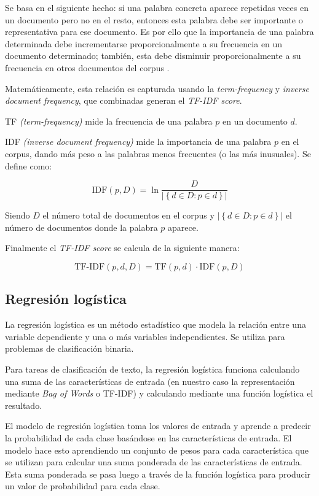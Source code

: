 Se basa en el siguiente hecho: si una palabra concreta aparece repetidas veces en un documento pero no en el resto, entonces esta palabra debe ser importante o representativa para ese documento. Es por ello que la importancia de una palabra determinada debe incrementarse proporcionalmente a su frecuencia en un documento determinado; también, esta debe disminuir proporcionalmente a su frecuencia en otros documentos del corpus \citep{Vajjala2020}.

Matemáticamente, esta relación es capturada usando la \textit{term-frequency} y \textit{inverse document frequency}, que combinadas generan el \textit{TF-IDF score}.

TF \textit{(term-frequency)} mide la frecuencia de una palabra $p$ en un documento $d$.

IDF \textit{(inverse document frequency)} mide la importancia de una palabra $p$ en el corpus, dando más peso a las palabras menos frecuentes (o las más inusuales). Se define como:

\begin{equation}
    \text{IDF}(p, D) = \ln{\frac{D}{\lvert\left\{d\in D: p \in d\right\}\rvert}}
\end{equation}

Siendo $D$ el número total de documentos en el corpus y $\lvert\left\{d\in D: p \in d\right\}\rvert$ el número de documentos donde la palabra $p$ aparece.

Finalmente el \textit{TF-IDF score} se calcula de la siguiente manera:

\begin{equation}
    \text{TF-IDF}(p, d, D) = \text{TF}(p, d) \cdot \text{IDF}(p, D)
\end{equation}

\subsection{Regresión logística}

La regresión logística es un método estadístico que modela la relación entre una variable dependiente y una o más variables independientes. Se utiliza para problemas de clasificación binaria.

Para tareas de clasificación de texto, la regresión logística funciona calculando una suma de las características de entrada (en nuestro caso la representación mediante \textit{Bag of Words} o TF-IDF) y calculando mediante una función logística el resultado. 

El modelo de regresión logística toma los valores de entrada y aprende a predecir la probabilidad de cada clase basándose en las características de entrada. El modelo hace esto aprendiendo un conjunto de pesos para cada característica que se utilizan para calcular una suma ponderada de las características de entrada. Esta suma ponderada se pasa luego a través de la función logística para producir un valor de probabilidad para cada clase.

